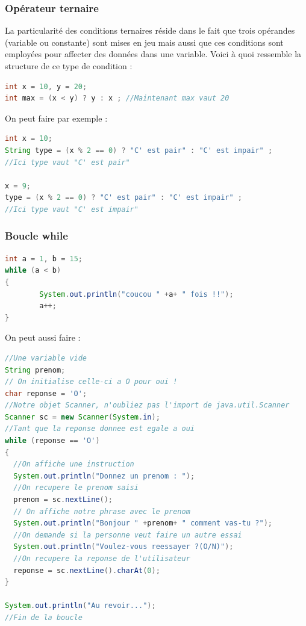 \documentclass[a4paper,twoside]{article}
\begin{document}
\subsubsection{Opérateur ternaire}
La particularité des conditions ternaires réside dans le fait que trois opérandes (variable ou constante) sont mises en jeu mais aussi que ces conditions sont employées pour affecter des données dans une variable. Voici à quoi ressemble la structure de ce type de condition :
\begin{lstlisting}[language=java]
int x = 10, y = 20;
int max = (x < y) ? y : x ; //Maintenant max vaut 20
\end{lstlisting}

On peut faire par exemple : 
\begin{lstlisting}[language=java]
int x = 10;
String type = (x % 2 == 0) ? "C' est pair" : "C' est impair" ; 
//Ici type vaut "C' est pair"

x = 9;
type = (x % 2 == 0) ? "C' est pair" : "C' est impair" ; 
//Ici type vaut "C' est impair"
\end{lstlisting}

\subsubsection{Boucle while}
\begin{lstlisting}[language=java]
int a = 1, b = 15;
while (a < b)
{
        System.out.println("coucou " +a+ " fois !!");
        a++;
}
\end{lstlisting}

On peut aussi faire :
\begin{lstlisting}[language=java]
//Une variable vide
String prenom;
// On initialise celle-ci a O pour oui !
char reponse = 'O';
//Notre objet Scanner, n'oubliez pas l'import de java.util.Scanner
Scanner sc = new Scanner(System.in);
//Tant que la reponse donnee est egale a oui
while (reponse == 'O')
{
  //On affiche une instruction
  System.out.println("Donnez un prenom : ");
  //On recupere le prenom saisi
  prenom = sc.nextLine();
  // On affiche notre phrase avec le prenom
  System.out.println("Bonjour " +prenom+ " comment vas-tu ?");
  //On demande si la personne veut faire un autre essai
  System.out.println("Voulez-vous reessayer ?(O/N)");
  //On recupere la reponse de l'utilisateur
  reponse = sc.nextLine().charAt(0);
}
 
System.out.println("Au revoir...");
//Fin de la boucle
\end{lstlisting}
\end{document}
